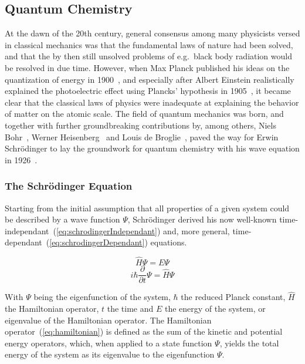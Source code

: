 \documentclass[12pt]{article}
\begin{document}
\subsection{Quantum Chemistry}
At the dawn of the 20th century, general consensus among many physicists versed in classical mechanics was that the
fundamental laws of nature had been solved, and that the by then still unsolved problems of e.g.~black body radiation
would be resolved in due time. However, when Max Planck published his ideas on the quantization of energy in 1900~\cite{Planck1901}, and especially
after Albert Einstein realistically explained the photoelectric effect using Plancks' hypothesis in 1905~\cite{Einstein1905}, it became clear that the classical laws of physics were 
inadequate at explaining the behavior of matter on the atomic scale.
The field of quantum mechanics was born, and together with further groundbreaking contributions by, among others, Niels Bohr~\cite{Bohr1913}, Werner Heisenberg~\cite{Heisenberg1927} and Louis de Broglie~\cite{Broglie1924},
paved the way for Erwin Schrödinger to lay the groundwork for quantum chemistry with his wave equation in 1926~\cite{Schrdinger1926}\cite{Schrdinger1926-2}.
\subsubsection{The Schrödinger Equation}
Starting from the initial assumption that all properties of a given system could be described by a wave function $\Psi$, Schrödinger derived his now well-known
time-independant~(\ref{eq:schrodingerIndependant}) and, more general, time-dependant~(\ref{eq:schrodingerDependant}) equations.


\begin{equation}
  \hat{H}\Psi = E\Psi
  \label{eq:schrodingerIndependant}
\end{equation}
\begin{equation}
  i\hbar\frac{\partial}{\partial t}\Psi = \hat{H}\Psi
  \label{eq:schrodingerDependant}
\end{equation}

\bigskip

\noindent With $\Psi$ being the eigenfunction of the system, $\hbar$ the reduced Planck constant, $\hat{H}$ the Hamiltonian operator, $t$ the time and $E$ the energy of the system, or eigenvalue of the Hamiltonian operator.
The Hamiltonian operator~(\ref{eq:hamiltonian}) is defined as the sum of the kinetic and potential energy operators, which, when applied to a state function $\Psi$, yields the total energy of the system as its eigenvalue to the eigenfunction $\Psi$.
\end{document}
